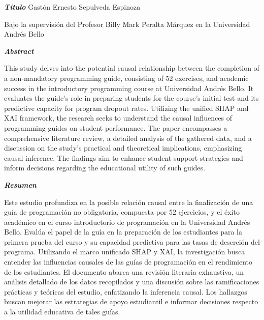 \begin{center}
    \textbf{\LARGE \textit{Título}}
    \vfill
    Gastón Ernesto Sepulveda Espinoza

    Bajo la supervisión del Profesor Billy Mark Peralta Márquez en la Universidad Andrés Bello

\end{center}
\vfill

\begin{center}
    \textbf{\LARGE \textit{Abstract}}
\end{center}

This study delves into the potential causal relationship between the completion of a non-mandatory programming guide, consisting of 52 exercises, and academic success in the introductory programming course at Universidad Andrés Bello. It evaluates the guide's role in preparing students for the course's initial test and its predictive capacity for program dropout rates. Utilizing the unified SHAP and XAI framework, the research seeks to understand the causal influences of programming guides on student performance. The paper encompasses a comprehensive literature review, a detailed analysis of the gathered data, and a discussion on the study's practical and theoretical implications, emphasizing causal inference. The findings aim to enhance student support strategies and inform decisions regarding the educational utility of such guides.

\vfill

\begin{center}
    \textbf{\LARGE \textit{Resumen}}
\end{center}

Este estudio profundiza en la posible relación causal entre la finalización de una guía de programación no obligatoria, compuesta por 52 ejercicios, y el éxito académico en el curso introductorio de programación en la Universidad Andrés Bello. Evalúa el papel de la guía en la preparación de los estudiantes para la primera prueba del curso y su capacidad predictiva para las tasas de deserción del programa. Utilizando el marco unificado SHAP y XAI, la investigación busca entender las influencias causales de las guías de programación en el rendimiento de los estudiantes. El documento abarca una revisión literaria exhaustiva, un análisis detallado de los datos recopilados y una discusión sobre las ramificaciones prácticas y teóricas del estudio, enfatizando la inferencia causal. Los hallazgos buscan mejorar las estrategias de apoyo estudiantil e informar decisiones respecto a la utilidad educativa de tales guías.
\vfill
